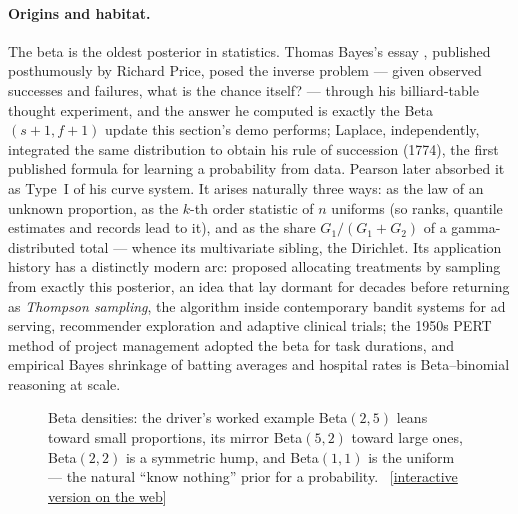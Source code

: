 \documentclass[11pt]{article}
\numberwithin{equation}{section}
\newcommand{\siteurl}{https://sanya-shopper.github.io/distribs/}
\newcommand{\webfig}[1]{{\small\sffamily\color{inkS}%
  [\href{\siteurl\##1}{interactive version on the web}]}}
\begin{document}
\paragraph{Origins and habitat.}
The beta is the oldest posterior in statistics.  Thomas Bayes's essay
\citep{bayes1763}, published posthumously by Richard Price, posed the
inverse problem --- given observed successes and failures, what is the
chance itself? --- through his billiard-table thought experiment, and the
answer he computed is exactly the Beta$(s{+}1, f{+}1)$ update this
section's demo performs; Laplace, independently, integrated the same
distribution to obtain his rule of succession (1774), the first published
formula for learning a probability from data.  Pearson later absorbed it
as Type~I of his curve system.  It arises naturally three ways: as the
law of an unknown proportion, as the $k$-th order statistic of $n$
uniforms (so ranks, quantile estimates and records lead to it), and as
the share $G_1/(G_1{+}G_2)$ of a gamma-distributed total --- whence its
multivariate sibling, the Dirichlet.  Its application history has a
distinctly modern arc: \citet{thompson1933} proposed allocating
treatments by sampling from exactly this posterior, an idea that lay
dormant for decades before returning as \emph{Thompson sampling}, the
algorithm inside contemporary bandit systems for ad serving, recommender
exploration and adaptive clinical trials; the 1950s PERT method of
project management adopted the beta for task durations, and empirical
Bayes shrinkage of batting averages and hospital rates is Beta--binomial
reasoning at scale.

\begin{figure}[htbp]
\centering
{}
\caption{Beta densities: the driver's worked example Beta$(2,5)$ leans
toward small proportions, its mirror Beta$(5,2)$ toward large ones,
Beta$(2,2)$ is a symmetric hump, and Beta$(1,1)$ is the uniform ---
the natural ``know nothing'' prior for a probability.\ \webfig{beta}}
\label{fig:beta}
\end{figure}
\end{document}
